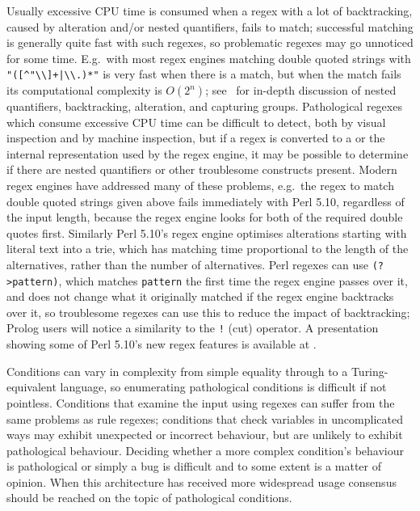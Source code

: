 Usually excessive CPU time is consumed when a regex with a lot of
backtracking, caused by alteration and/or nested quantifiers, fails to
match; successful matching is generally quite fast with such regexes, so
problematic regexes may go unnoticed for some time.  E.g.\ with most regex
engines matching double quoted strings with \verb!"([^"\\]+|\\.)*"! is very
fast when there is a match, but when the match fails its computational
complexity is $O(2^{n})$; see~\cite{mastering-regular-expressions} for
in-depth discussion of nested quantifiers, backtracking, alteration, and
capturing groups.  Pathological regexes which consume excessive CPU time
can be difficult to detect, both by visual inspection and by machine
inspection, but if a regex is converted to a  or the internal
representation used by the regex engine, it may be possible to determine if
there are nested quantifiers or other troublesome constructs present.
Modern regex engines have addressed many of these problems, e.g.\ the regex
to match double quoted strings given above fails immediately with Perl
5.10, regardless of the input length, because the regex engine looks for
both of the required double quotes first.  Similarly Perl 5.10's regex
engine optimises alterations starting with literal text into a trie, which
has matching time proportional to the length of the alternatives, rather
than the number of alternatives.  Perl regexes can use \verb!(?>pattern)!,
which matches \verb!pattern! the first time the regex engine passes over
it, and does not change what it originally matched if the regex engine
backtracks over it, so troublesome regexes can use this to reduce the
impact of backtracking; Prolog users will notice a similarity to the
\verb'!' (cut) operator.  A presentation showing some of Perl 5.10's new
regex features is available at
.

Conditions can vary in complexity from simple equality through to a
Turing-equivalent language, so enumerating pathological conditions is
difficult if not pointless.  Conditions that examine the input using
regexes can suffer from the same problems as rule regexes; conditions that
check variables in uncomplicated ways may exhibit unexpected or incorrect
behaviour, but are unlikely to exhibit pathological behaviour.  Deciding
whether a more complex condition's behaviour is pathological or simply a
bug is difficult and to some extent is a matter of opinion.  When this
architecture has received more widespread usage consensus should be reached
on the topic of pathological conditions.

